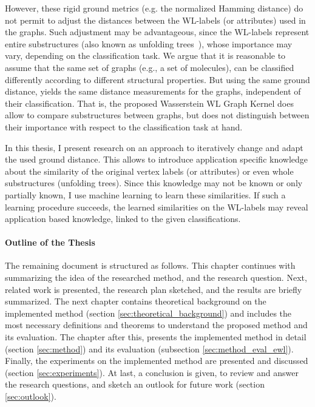 	However, these rigid ground metrics (e.g. the normalized Hamming distance) do not permit to adjust the distances between the WL-labels (or attributes) used in the graphs.
	Such adjustment may be advantageous, since the WL-labels represent entire substructures (also known as unfolding trees~\cite{2021_Schulz_CONF}), whose importance may vary, depending on the classification task.
	We argue that it is reasonable to assume that the same set of graphs (e.g., a set of molecules), can be classified differently according to different structural properties.
	But using the same ground distance, yields the same distance measurements for the graphs, independent of their classification.
	That is, the proposed Wasserstein WL Graph Kernel does allow to compare substructures between graphs, but does not distinguish between their importance with respect to the classification task at hand.
	
	In this thesis, I present research on an approach to iteratively change and adapt the used ground distance.	
	This allows to introduce application specific knowledge about the similarity of the original vertex labels (or attributes) or even whole substructures (unfolding trees).
	Since this knowledge may not be known or only partially known, I use machine learning to learn these similarities.
	If such a learning procedure succeeds, the learned similarities on the WL-labels may reveal application based knowledge, linked to the given classifications.
		
	\paragraph{Outline of the Thesis} 
	The remaining document is structured as follows.
	This chapter continues with summarizing the idea of the researched method, and the research question.		
	Next, related work is presented, the research plan sketched, and the results are briefly summarized.	
	The next chapter contains theoretical background on the implemented method (section \ref{sec:theoretical_background}) and includes the most necessary definitions and theorems to understand the proposed method and its evaluation.
	The chapter after this, presents the implemented method in detail (section \ref{sec:method}) and its evaluation (subsection \ref{sec:method_eval_ewl}).
	Finally, the experiments on the implemented method are presented and discussed (section \ref{sec:experiments}).
	At last, a conclusion is given, to review and answer the research questions, and sketch an outlook for future work (section \ref{sec:outlook}).
		
